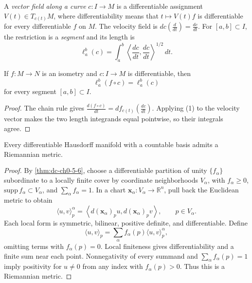 \begin{definition}
  \label{def:dc-ch1-2-9}


  A \emph{vector field along a curve} $c:I\to M$ is a differentiable assignment
  $V(t)\in T_{c(t)}M$, where differentiability means that $t\mapsto V(t)f$ is
  differentiable for every differentiable $f$ on $M$. The velocity field is
  $dc(\frac{d}{dt})=\frac{dc}{dt}$. For $[a,b]\subset I$, the restriction is a
  \emph{segment} and its length is
  $$
  \ell_a^b(c)=\int_a^b\left\langle\frac{dc}{dt},\frac{dc}{dt}\right\rangle^{1/2}\,dt.
  $$
\end{definition}

\begin{lemma}
  \label{lem:dc-ch1-2-9-isom}


  If $f:M\to N$ is an isometry and $c:I\to M$ is differentiable, then
  $$
  \ell_a^b(f\circ c)=\ell_a^b(c)
  $$
  for every segment $[a,b]\subset I$.
\end{lemma}
\begin{proof}

  \sketch
  The chain rule gives $\frac{d(f\circ c)}{dt}=df_{c(t)}(\frac{dc}{dt})$. Applying
  (1) to the velocity vector makes the two length integrands equal pointwise, so
  their integrals agree.
\end{proof}

\begin{proposition}
  \label{prop:dc-ch1-2-10}


  Every differentiable Hausdorff manifold with a countable basis admits a
  Riemannian metric.
\end{proposition}
\begin{proof}

  \sketch
  By \cref{thm:dc-ch0-5-6}, choose a differentiable partition of unity
  $\{f_\alpha\}$ subordinate to a locally finite cover by coordinate neighborhoods
  $V_\alpha$, with $f_\alpha\ge0$, $\mathrm{supp}\,f_\alpha\subset V_\alpha$,
  and $\sum_\alpha f_\alpha=1$. In a chart
  $\mathbf{x}_\alpha:V_\alpha\to\mathbb{R}^n$, pull back the Euclidean metric to
  obtain
  $$
  \langle u,v\rangle_p^\alpha=
  \left\langle d(\mathbf{x}_\alpha)_p u,d(\mathbf{x}_\alpha)_p v\right\rangle,
  \qquad p\in V_\alpha.
  $$
  Each local form is symmetric, bilinear, positive definite, and differentiable.
  Define
  $$
  \langle u,v\rangle_p=\sum_\alpha f_\alpha(p)\langle u,v\rangle_p^\alpha,
  $$
  omitting terms with $f_\alpha(p)=0$. Local finiteness gives differentiability and
  a finite sum near each point. Nonnegativity of every summand and
  $\sum_\alpha f_\alpha(p)=1$ imply positivity for $u\ne0$ from any index with
  $f_\alpha(p)>0$. Thus this is a Riemannian metric.
\end{proof}

